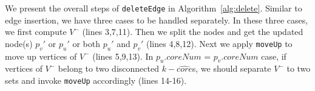We present the overall steps of {\tt deleteEdge} in Algorithm~\ref{alg:delete}.
Similar to edge insertion, we have three cases to be handled separately.
In these three cases, we first compute $V^-$ (lines 3,7,11).
Then we split the nodes and get the updated node(s) $p_v'$ or $p_u'$ or both $p_u'$ and $p_v'$ (lines 4,8,12).
Next we apply {\tt moveUp} to move up vertices of $V^-$ (lines 5,9,13).
In $p_u.coreNum$ = $p_v.coreNum$ case, if vertices of $V^-$ belong to two disconnected $k-\widehat{core}$s,
we should separate $V^-$ to two sets and invoke {\tt moveUp} accordingly (lines 14-16).



